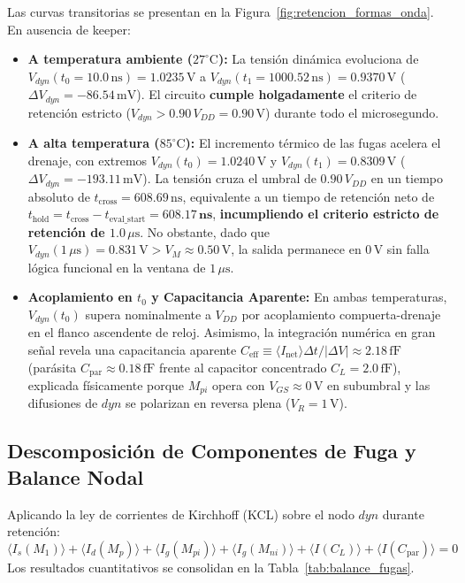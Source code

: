 Las curvas transitorias se presentan en la Figura~\ref{fig:retencion_formas_onda}. En ausencia de keeper:
\begin{itemize}[leftmargin=1.4em,itemsep=0.12em]
  \item \textbf{A temperatura ambiente ($27^\circ\text{C}$):} La tensión dinámica evoluciona de $V_{dyn}(t_0 = 10.0\,\text{ns}) = 1.0235\,\text{V}$ a $V_{dyn}(t_1 = 1000.52\,\text{ns}) = 0.9370\,\text{V}$ ($\Delta V_{dyn} = -86.54\,\text{mV}$). El circuito \textbf{cumple holgadamente} el criterio de retención estricto ($V_{dyn} > 0.90\,V_{DD} = 0.90\,\text{V}$) durante todo el microsegundo.
  \item \textbf{A alta temperatura ($85^\circ\text{C}$):} El incremento térmico de las fugas acelera el drenaje, con extremos $V_{dyn}(t_0) = 1.0240\,\text{V}$ y $V_{dyn}(t_1) = 0.8309\,\text{V}$ ($\Delta V_{dyn} = -193.11\,\text{mV}$). La tensión cruza el umbral de $0.90\,V_{DD}$ en un tiempo absoluto de $t_{\text{cross}} = 608.69\,\text{ns}$, equivalente a un tiempo de retención neto de $t_{\text{hold}} = t_{\text{cross}} - t_{\text{eval\_start}} = \mathbf{608.17\,\text{ns}}$, \textbf{incumpliendo el criterio estricto de retención de $1.0\,\mu\text{s}$}. No obstante, dado que $V_{dyn}(1\,\mu\text{s}) = 0.831\,\text{V} > V_M \approx 0.50\,\text{V}$, la salida permanece en $0\,\text{V}$ sin falla lógica funcional en la ventana de $1\,\mu\text{s}$.
  \item \textbf{Acoplamiento en $t_0$ y Capacitancia Aparente:} En ambas temperaturas, $V_{dyn}(t_0)$ supera nominalmente a $V_{DD}$ por acoplamiento compuerta-drenaje en el flanco ascendente de reloj. Asimismo, la integración numérica en gran señal revela una capacitancia aparente $C_{\text{eff}} \equiv \langle I_{\text{net}} \rangle \Delta t / |\Delta V| \approx 2.18\,\text{fF}$ (parásita $C_{\text{par}} \approx 0.18\,\text{fF}$ frente al capacitor concentrado $C_L=2.0\,\text{fF}$), explicada físicamente porque $M_{pi}$ opera con $V_{GS} \approx 0\,\text{V}$ en subumbral y las difusiones de $dyn$ se polarizan en reversa plena ($V_R = 1\,\text{V}$).
\end{itemize}

\subsection{Descomposición de Componentes de Fuga y Balance Nodal}
Aplicando la ley de corrientes de Kirchhoff (KCL) sobre el nodo $dyn$ durante retención:
\begin{equation}
  \langle I_s(M_1) \rangle + \langle I_d(M_p) \rangle + \langle I_g(M_{pi}) \rangle + \langle I_g(M_{ni}) \rangle + \langle I(C_L) \rangle + \langle I(C_{\text{par}}) \rangle = 0
  \label{eq:kcl_dyn}
\end{equation}
Los resultados cuantitativos se consolidan en la Tabla~\ref{tab:balance_fugas}.

